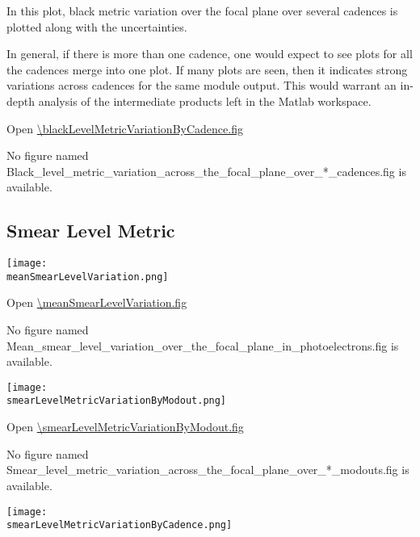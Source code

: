 In this plot, black metric variation over the focal plane over several
cadences is plotted along with the uncertainties.

In general, if there is more than one cadence, one would expect to see
plots for all the cadences merge into one plot. If many plots are
seen, then it indicates strong variations across cadences for the same
module output. This would warrant an in-depth analysis of the
intermediate products left in the Matlab workspace.

Open \url{\blackLevelMetricVariationByCadence.fig}

\else
No figure named
Black\_level\_metric\_variation\_across\_the\_focal\_plane\_over\_*\_cadences.fig is
available.
\fi
\clearpage

\subsection{Smear Level Metric}

\ifdefined \meanSmearLevelVariation

\begin{center}
  \texttt{[image: \\meanSmearLevelVariation.png]}
\end{center}

\meanSmearLevelVariationCaption

Open \url{\meanSmearLevelVariation.fig}

\else
No figure named
Mean\_smear\_level\_variation\_over\_the\_focal\_plane\_in\_photoelectrons.fig is
available.
\fi
\clearpage

\ifdefined \smearLevelMetricVariationByModout

\begin{center}
  \texttt{[image: \\smearLevelMetricVariationByModout.png]}
\end{center}

\smearLevelMetricVariationByModoutCaption

Open \url{\smearLevelMetricVariationByModout.fig}

\else
No figure named
Smear\_level\_metric\_variation\_across\_the\_focal\_plane\_over\_*\_modouts.fig is
available.
\fi
\clearpage

\ifdefined \smearLevelMetricVariationByCadence

\begin{center}
  \texttt{[image: \\smearLevelMetricVariationByCadence.png]}
\end{center}

